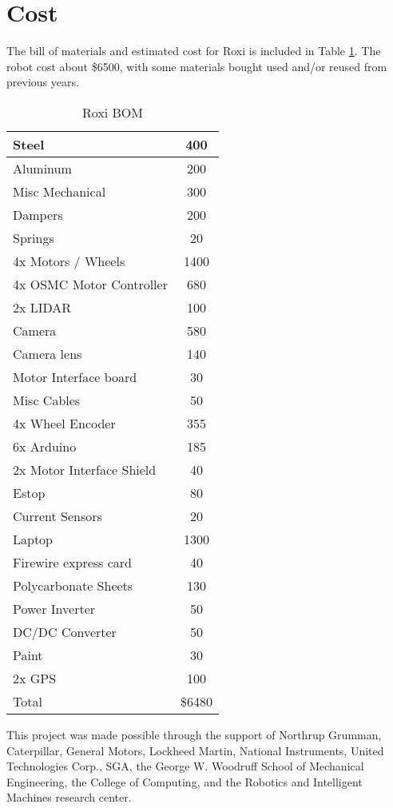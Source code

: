 \section{Cost}

The bill of materials and estimated cost for Roxi is included in Table \ref{TAB:Cost}. The robot cost about \$6500, with some materials bought used and/or reused from previous years.

\begin{table}[H]
\begin{center}
\caption{Roxi BOM}
\begin{tabular}{| l | c |}
\hline

Steel	&	400\\	\hline
Aluminum	&	200\\	\hline
Misc Mechanical	&	300\\	\hline
Dampers	&	200\\	\hline
Springs	&	20\\	\hline
4x Motors / Wheels	&	1400\\	\hline
4x OSMC Motor Controller	&	680\\	\hline
2x LIDAR	&	100\\	\hline
Camera	&	580\\	\hline
Camera lens	&	140\\	\hline
Motor Interface board	&	30\\	\hline
Misc Cables	&	50\\	\hline
4x Wheel Encoder	&	355\\	\hline
6x Arduino	&	185\\	\hline
2x Motor Interface Shield	&	40\\	\hline
Estop	&	80\\	\hline
Current Sensors	&	20\\	\hline
Laptop	&	1300\\	\hline
Firewire express card	&	40\\	\hline
Polycarbonate Sheets	&	130\\	\hline
Power Inverter	&	50\\	\hline
DC/DC Converter	&	50\\	\hline
Paint	&	30\\	\hline
2x GPS	&	100\\	\hline
Total	&	\$6480\\	
\hline


\end{tabular}
\label{TAB:Cost}
\end{center}
\end{table}

This project was made possible through the support of Northrup Grumman, Caterpillar, General Motors, Lockheed Martin, National Instruments, United Technologies Corp., SGA, the George W. Woodruff School of Mechanical Engineering, the College of Computing, and the  Robotics and Intelligent Machines research center.